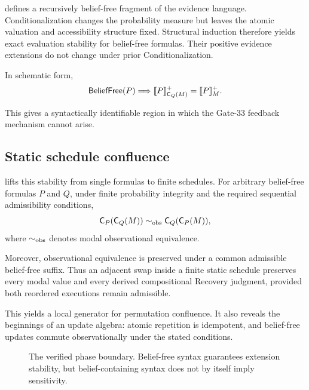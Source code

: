  defines a recursively belief-free fragment of the evidence language. Conditionalization changes the probability measure but leaves the atomic valuation and accessibility structure fixed. Structural induction therefore yields exact evaluation stability for belief-free formulas. Their positive evidence extensions do not change under prior Conditionalization.

In schematic form,
\[
\mathsf{BeliefFree}(P)
\Longrightarrow
\llbracket P\rrbracket^+_{\mathsf{C}_{Q}(M)}
=
\llbracket P\rrbracket^+_M.
\]

This gives a syntactically identifiable region in which the Gate-33 feedback mechanism cannot arise.

\subsection{Static schedule confluence}

 lifts this stability from single formulas to finite schedules. For arbitrary belief-free formulas $P$ and $Q$, under finite probability integrity and the required sequential admissibility conditions,
\[
\mathsf{C}_{P}(\mathsf{C}_{Q}(M))
\mathrel{\sim_{\mathrm{obs}}}
\mathsf{C}_{Q}(\mathsf{C}_{P}(M)),
\]
where $\mathrel{\sim_{\mathrm{obs}}}$ denotes modal observational equivalence.

Moreover, observational equivalence is preserved under a common admissible belief-free suffix. Thus an adjacent swap inside a finite static schedule preserves every modal value and every derived compositional Recovery judgment, provided both reordered executions remain admissible.

This yields a local generator for permutation confluence. It also reveals the beginnings of an update algebra: atomic repetition is idempotent, and belief-free updates commute observationally under the stated conditions.

\begin{figure}[ht]
\centering
{}
\caption{The verified phase boundary. Belief-free syntax guarantees extension stability, but belief-containing syntax does not by itself imply sensitivity.}
\label{fig:boundary}
\end{figure}

